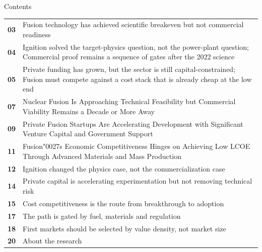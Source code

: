 \documentclass[10pt,a4paper]{article}
\newcommand{\BOApos}{{\BOQuoteFont\char"0027}}
\begin{document}
\clearpage
\noindent{}\par\vspace{8pt}
{\sffamily\fontsize{26}{31}\selectfont\color{BONavy} Contents}\par\vspace{10pt}
\begin{minipage}[t]{0.95\linewidth}
\begin{tabularx}{\linewidth}{p{12mm}Y}
\textcolor{BOGreen}{\bfseries 03} & {\footnotesize Fusion technology has achieved scientific breakeven but not commercial readiness} \\[4pt]
\textcolor{BOGreen}{\bfseries 04} & {\footnotesize Ignition solved the target-physics question, not the power-plant question; Commercial proof remains a sequence of gates after the 2022 science} \\[4pt]
\textcolor{BOGreen}{\bfseries 05} & {\footnotesize Private funding has grown, but the sector is still capital-constrained; Fusion must compete against a cost stack that is already cheap at the low end} \\[4pt]
\textcolor{BOGreen}{\bfseries 07} & {\footnotesize Nuclear Fusion Is Approaching Technical Feasibility but Commercial Viability Remains a Decade or More Away} \\[4pt]
\textcolor{BOGreen}{\bfseries 09} & {\footnotesize Private Fusion Startups Are Accelerating Development with Significant Venture Capital and Government Support} \\[4pt]
\textcolor{BOGreen}{\bfseries 11} & {\footnotesize Fusion\BOApos{}s Economic Competitiveness Hinges on Achieving Low LCOE Through Advanced Materials and Mass Production} \\[4pt]
\textcolor{BOGreen}{\bfseries 12} & {\footnotesize Ignition changed the physics case, not the commercialization case} \\[4pt]
\textcolor{BOGreen}{\bfseries 14} & {\footnotesize Private capital is accelerating experimentation but not removing technical risk} \\[4pt]
\textcolor{BOGreen}{\bfseries 15} & {\footnotesize Cost competitiveness is the route from breakthrough to adoption} \\[4pt]
\textcolor{BOGreen}{\bfseries 17} & {\footnotesize The path is gated by fuel, materials and regulation} \\[4pt]
\textcolor{BOGreen}{\bfseries 18} & {\footnotesize First markets should be selected by value density, not market size} \\[4pt]
\textcolor{BOGreen}{\bfseries 20} & {\footnotesize About the research} \\[4pt]
\end{tabularx}
\end{minipage}
\clearpage
\end{document}
